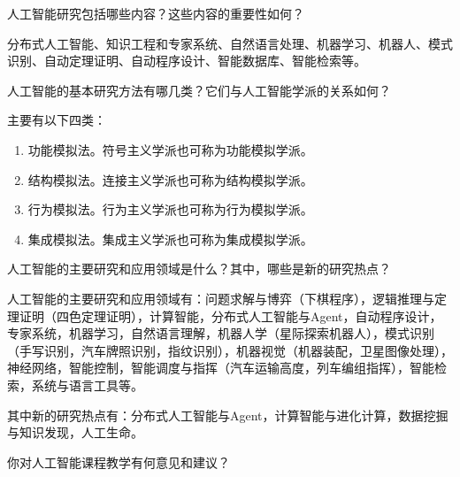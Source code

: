 \begin{question}
人工智能研究包括哪些内容？这些内容的重要性如何？
\end{question}
\begin{solution}
分布式人工智能、知识工程和专家系统、自然语言处理、机器学习、机器人、模式识别、自动定理证明、自动程序设计、智能数据库、智能检索等。
\end{solution}

\begin{question}
人工智能的基本研究方法有哪几类？它们与人工智能学派的关系如何？
\end{question}
\begin{solution}
主要有以下四类：
	\begin{enumerate}
		\item 功能模拟法。符号主义学派也可称为功能模拟学派。
		\item 结构模拟法。连接主义学派也可称为结构模拟学派。
		\item 行为模拟法。行为主义学派也可称为行为模拟学派。
		\item 集成模拟法。集成主义学派也可称为集成模拟学派。
	\end{enumerate}
\end{solution}

\begin{question}
人工智能的主要研究和应用领域是什么？其中，哪些是新的研究热点？
\end{question}
\begin{solution}
人工智能的主要研究和应用领域有：问题求解与博弈（下棋程序），逻辑推理与定理证明（四色定理证明），计算智能，分布式人工智能与Agent，自动程序设计，专家系统，机器学习，自然语言理解，机器人学（星际探索机器人），模式识别（手写识别，汽车牌照识别，指纹识别），机器视觉（机器装配，卫星图像处理），神经网络，智能控制，智能调度与指挥（汽车运输高度，列车编组指挥），智能检索，系统与语言工具等。 \par
其中新的研究热点有：分布式人工智能与Agent，计算智能与进化计算，数据挖掘与知识发现，人工生命。
\end{solution}

\begin{question}
你对人工智能课程教学有何意见和建议？
\end{question}
